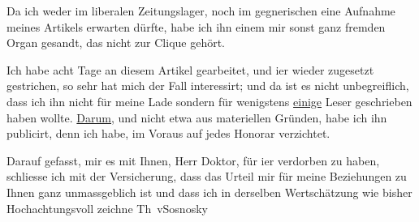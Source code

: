 \pstart
           Da ich weder im liberalen Zeitungslager, noch im gegnerischen eine Aufnahme meines
                  Artikels erwarten dürfte,
               habe ich ihn einem mir sonst ganz fremden Organ gesandt, das nicht zur Clique gehört.\pend
           
\pstart
           Ich habe acht Tage an diesem Artikel gearbeitet, und i{\geminationm}er {\pb}wieder
               zugesetzt {\kaufmannsund} gestrichen, so sehr hat mich der Fall
               interessirt; und da ist es nicht unbegreiflich, dass ich ihn nicht für meine Lade
               sondern für wenigstens \uline{einige} Leser geschrieben haben
               wollte. \uline{Darum}, und nicht etwa aus materiellen
               Gründen, habe ich ihn publicirt, denn ich habe, im Voraus auf jedes Honorar
               verzichtet.\pend
           
\pstart
           Darauf gefasst, mir es mit Ihnen, Herr Doktor, für i{\geminationm}er
               verdorben zu haben, schliesse ich mit der Versicherung, dass das Urteil mir für meine
               Beziehungen zu Ihnen ganz un{\pb}massgeblich ist und dass ich in
               derselben Wertschätzung wie bisher\pend
           \pstart Hochachtungsvoll zeichne \spacefill\mbox{Th vSosnosky}\pend{}\endnumbering{}
\begin{anhang}
\end{anhang}\newcommand{\dateiname}{L04233}\newcommand{\titel}{Theodor von Sosnosky an Arthur Schnitzler, 9. 10. 1901}\newcommand{\editorInnen}{Herausgegeben von Jahnke, SelmaMüller, Martin Anton}
